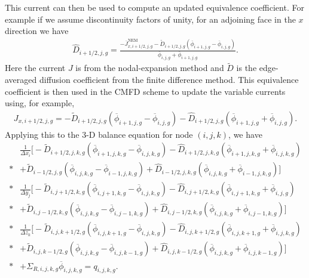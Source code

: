 This current can then be used to compute an updated equivalence coefficient. For example if we assume discontinuity factors of unity, for an adjoining face in the $x$ direction we have
\begin{align}
  \widehat{D}_{i+1/2,j,g} = \frac{ -\overline{J}_{x,i+1/2,j,g}^{\text{NEM}} - \widetilde{D}_{i+1/2,j,g} ( \overline{\phi}_{i+1,j,g} - \overline{\phi}_{i,j,g} ) }{ \overline{\phi}_{i,j,g} + \overline{\phi}_{i+1,j,g} } .
\end{align}
Here the current $J$ is from the nodal-expansion method and $\widetilde{D}$ is the edge-averaged diffusion coefficient from the finite difference method. This equivalence coefficient is then used in the CMFD scheme to update the variable currents using, for example,
\begin{align}
  J_{x,i+1/2,j,g} = -\widetilde{D}_{i+1/2,j,g} \left( \overline{\phi}_{i+1,j,g} - \overline{\phi}_{i,j,g} \right) - \widehat{D}_{i+1/2,j,g} \left( \overline{\phi}_{i+1,j,g} + \overline{\phi}_{i,j,g} \right) .
\end{align}
Applying this to the 3-D balance equation for node $(i,j,k)$, we have
\begin{align}
  &\frac{1}{\Delta x_{i}} \bigg[ -\widetilde{D}_{i+1/2,j,k,g} \left( \overline{\phi}_{i+1,j,k,g} - \overline{\phi}_{i,j,k,g} \right) - \widehat{D}_{i+1/2,j,k,g} \left( \overline{\phi}_{i+1,j,k,g} + \overline{\phi}_{i,j,k,g} \right) \nonumber \\*
 &+ \widetilde{D}_{i-1/2,j,g} \left( \overline{\phi}_{i,j,k,g} - \overline{\phi}_{i-1,j,k,g} \right) + \widehat{D}_{i-1/2,j,k,g} \left( \overline{\phi}_{i,j,k,g} + \overline{\phi}_{i-1,j,k,g} \right) \bigg] \nonumber \\*
  &\frac{1}{\Delta y_{j}} \bigg[ -\widetilde{D}_{i,j+1/2,k,g} \left( \overline{\phi}_{i,j+1,k,g} - \overline{\phi}_{i,j,k,g} \right) - \widehat{D}_{i,j+1/2,k,g} \left( \overline{\phi}_{i,j+1,k,g} + \overline{\phi}_{i,j,g} \right) \nonumber \\*
 &+ \widetilde{D}_{i,j-1/2,k,g} \left( \overline{\phi}_{i,j,k,g} - \overline{\phi}_{i,j-1,k,g} \right) + \widehat{D}_{i,j-1/2,k,g} \left( \overline{\phi}_{i,j,k,g} + \overline{\phi}_{i,j-1,k,g} \right) \bigg] \nonumber \\* 
  &\frac{1}{\Delta z_{k}} \bigg[ -\widetilde{D}_{i,j,k+1/2,g} \left( \overline{\phi}_{i,j,k+1,g} - \overline{\phi}_{i,j,k,g} \right) - \widehat{D}_{i,j,k+1/2,g} \left( \overline{\phi}_{i,j,k+1,g} + \overline{\phi}_{i,j,k,g} \right) \nonumber \\*
 &+ \widetilde{D}_{i,j,k-1/2,g} \left( \overline{\phi}_{i,j,k,g} - \overline{\phi}_{i,j,k-1,g} \right) + \widehat{D}_{i,j,k-1/2,g} \left( \overline{\phi}_{i,j,k,g} + \overline{\phi}_{i,j,k-1,g} \right) \bigg] \nonumber \\* 
 &+ \Sigma_{R,i,j,k,g} \overline{\phi}_{i,j,k,g} = q_{i,j,k,g} .
\end{align}

